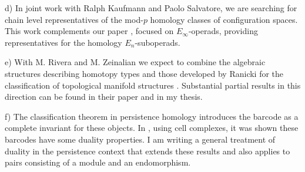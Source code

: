 d) In joint work with Ralph Kaufmann and Paolo Salvatore, we are searching for chain level representatives of the mod-$p$ homology classes of configuration spaces.
This work complements our paper \cite{medina2020maysteenrod}, focused on $E_\infty$-operads, providing representatives for the homology $E_n$-suboperads.

e) With M. Rivera and M. Zeinalian we expect to combine the algebraic structures describing homotopy types \cite{sullivan1977infinitesimal, mandell2001padic} and those developed by Ranicki for the classification of topological manifold structures \cite{ranicki1992topological}.
Substantial partial results in this direction can be found in their paper \cite{rivera2019functor} and in my thesis.

f) The classification theorem in persistence homology introduces the barcode as a complete invariant for these objects.
In \cite{de2011dualities}, using cell complexes, it was shown these barcodes have some duality properties.
I am writing a general treatment of duality in the persistence context that extends these results and also applies to pairs consisting of a module and an endomorphism.